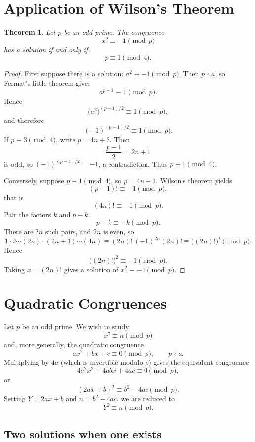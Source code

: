 \documentclass[11pt]{article}
\newtheorem{theorem}{Theorem}[section]
\theoremstyle{remark}
\begin{document}
\section{Application of Wilson's Theorem}

\begin{theorem}
Let $p$ be an odd prime. The congruence
\[
    x^2\equiv -1\pmod p
\]
has a solution if and only if
\[
    p\equiv 1\pmod 4.
\]
\end{theorem}

\begin{proof}
First suppose there is a solution: $a^2\equiv -1\pmod p$. Then $p\nmid a$, so
Fermat's little theorem gives
\[
    a^{p-1}\equiv 1\pmod p.
\]
Hence
\[
    \bigl(a^2\bigr)^{(p-1)/2}\equiv 1\pmod p,
\]
and therefore
\[
    (-1)^{(p-1)/2}\equiv 1\pmod p.
\]
If $p\equiv 3\pmod 4$, write $p=4n+3$. Then
\[
    \frac{p-1}{2}=2n+1
\]
is odd, so $(-1)^{(p-1)/2}=-1$, a contradiction. Thus $p\equiv 1\pmod 4$.

Conversely, suppose $p\equiv 1\pmod 4$, so $p=4n+1$. Wilson's theorem yields
\[
    (p-1)!\equiv -1\pmod p,
\]
that is
\[
    (4n)!\equiv -1\pmod p.
\]
Pair the factors $k$ and $p-k$:
\[
    p-k\equiv -k\pmod p.
\]
There are $2n$ such pairs, and $2n$ is even, so
\[
    1\cdot 2\cdots (2n)\cdot(2n+1)\cdots(4n)
    \equiv
    (2n)!\,(-1)^{2n}(2n)!
    \equiv
    \bigl((2n)!\bigr)^2
    \pmod p.
\]
Hence
\[
    \bigl((2n)!\bigr)^2\equiv -1\pmod p.
\]
Taking $x=(2n)!$ gives a solution of $x^2\equiv -1\pmod p$.
\end{proof}

\section{Quadratic Congruences}

Let $p$ be an odd prime. We wish to study
\[
    x^2\equiv n\pmod p
\]
and, more generally, the quadratic congruence
\[
    ax^2+bx+c\equiv 0\pmod p,
    \qquad p\nmid a.
\]
Multiplying by $4a$ (which is invertible modulo $p$) gives the equivalent
congruence
\[
    4a^2x^2+4abx+4ac\equiv 0\pmod p,
\]
or
\[
    (2ax+b)^2\equiv b^2-4ac\pmod p.
\]
Setting $Y=2ax+b$ and $n=b^2-4ac$, we are reduced to
\[
    Y^2\equiv n\pmod p.
\]

\subsection{Two solutions when one exists}
\end{document}
